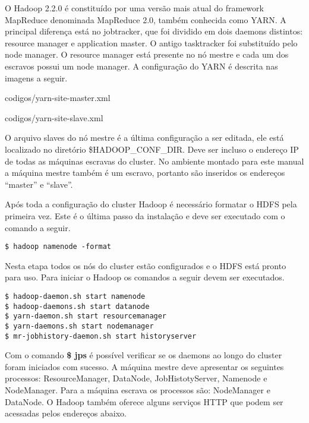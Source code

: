 \begin{apendicesenv}
O Hadoop 2.2.0 é constituído por uma versão mais atual do framework MapReduce denominada MapReduce 2.0, também conhecida como YARN. A principal diferença está no jobtracker, que foi dividido em dois daemons distintos: resource manager e application master. O antigo tasktracker foi substituído pelo node manager. O resource manager está presente no nó mestre e cada um dos escravos possui um node manager. A configuração do YARN é descrita nas imagens a seguir.

\newpage

		{codigos/yarn-site-master.xml}

\newpage

		{codigos/yarn-site-slave.xml}


O arquivo slaves do nó mestre é a última configuração a ser editada, ele está localizado no diretório \$HADOOP\_CONF\_DIR. Deve ser incluso o endereço IP de todas as máquinas escravas do cluster. No ambiente montado para este manual a máquina mestre também é um escravo, portanto são inseridos os endereços “master” e “slave”.

Após toda a configuração do cluster Hadoop é necessário formatar o HDFS pela primeira vez. Este é o última passo da instalação e deve ser executado com o comando a seguir.

\begin{lstlisting}[style=abnt,frame=single]
$ hadoop namenode -format
\end{lstlisting}

Nesta etapa todos os nós do cluster estão configurados e o HDFS está pronto para uso. Para iniciar o Hadoop os comandos a seguir devem ser executados.

\newpage
\begin{lstlisting}[style=abnt,frame=single]
$ hadoop-daemon.sh start namenode 
$ hadoop-daemons.sh start datanode 
$ yarn-daemon.sh start resourcemanager 
$ yarn-daemons.sh start nodemanager 
$ mr-jobhistory-daemon.sh start historyserver
\end{lstlisting}

Com o comando \textbf{\$ jps} é possível verificar se os daemons ao longo do cluster foram iniciados com sucesso. A máquina mestre deve apresentar os seguintes processos: ResourceManager, DataNode, JobHistotyServer, Namenode e NodeManager. Para a máquina escrava os processos são: NodeManager e DataNode. O Hadoop também oferece alguns serviços HTTP que podem ser acessadas pelos endereços abaixo.


\end{apendicesenv}
